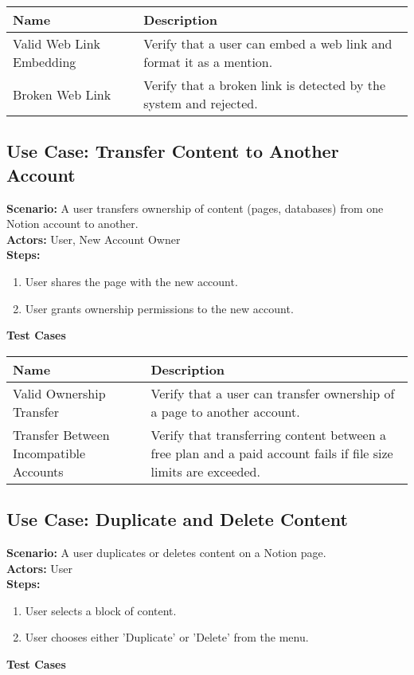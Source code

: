\documentclass{article}
\begin{document}
            \begin{longtable}{|p{}|p{}|}
            \hline
            \textbf{Name} & \textbf{Description} \\
            \hline
            Valid Web Link Embedding & Verify that a user can embed a web link and format it as a mention. \\
\hline
Broken Web Link & Verify that a broken link is detected by the system and rejected. \\
\hline
\end{longtable}\subsection{\textbf{Use Case: Transfer Content to Another Account}}
\textbf{Scenario:} A user transfers ownership of content (pages, databases) from one Notion account to another.\\
\textbf{Actors:} User, New Account Owner\\
\textbf{Steps:}
\begin{enumerate}
\item User shares the page with the new account.
\item User grants ownership permissions to the new account.
\end{enumerate}
\textbf{Test Cases}

            \begin{longtable}{|p{}|p{}|}
            \hline
            \textbf{Name} & \textbf{Description} \\
            \hline
            Valid Ownership Transfer & Verify that a user can transfer ownership of a page to another account. \\
\hline
Transfer Between Incompatible Accounts & Verify that transferring content between a free plan and a paid account fails if file size limits are exceeded. \\
\hline
\end{longtable}\subsection{\textbf{Use Case: Duplicate and Delete Content}}
\textbf{Scenario:} A user duplicates or deletes content on a Notion page.\\
\textbf{Actors:} User\\
\textbf{Steps:}
\begin{enumerate}
\item User selects a block of content.
\item User chooses either 'Duplicate' or 'Delete' from the menu.
\end{enumerate}
\textbf{Test Cases}
\end{document}
